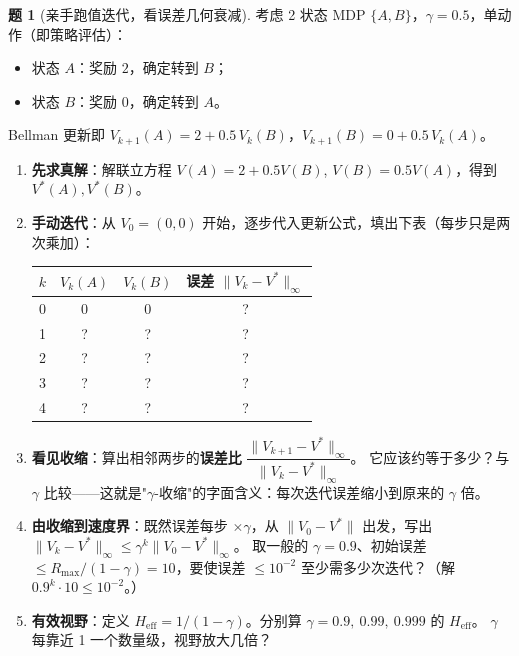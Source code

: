 \documentclass[11pt,a4paper]{article}
\theoremstyle{definition}
\newtheorem{problem}{题}
\begin{document}
\medskip

\begin{problem}[亲手跑值迭代，看误差几何衰减]
考虑 2 状态 MDP $\{A, B\}$，$\gamma = 0.5$，单动作（即策略评估）：
\begin{itemize}
    \item 状态 $A$：奖励 $2$，确定转到 $B$；
    \item 状态 $B$：奖励 $0$，确定转到 $A$。
\end{itemize}
Bellman 更新即 $V_{k+1}(A) = 2 + 0.5\,V_k(B)$，$V_{k+1}(B) = 0 + 0.5\,V_k(A)$。

\begin{enumerate}[label=(\alph*)]
    \item \textbf{先求真解}：解联立方程 $V(A) = 2 + 0.5 V(B)$, $V(B) = 0.5 V(A)$，得到 $V^*(A), V^*(B)$。
    \item \textbf{手动迭代}：从 $V_0 = (0, 0)$ 开始，逐步代入更新公式，填出下表（每步只是两次乘加）：
    \begin{center}
    \begin{tabular}{c|c|c|c}
    \toprule
    $k$ & $V_k(A)$ & $V_k(B)$ & 误差 $\|V_k - V^*\|_\infty$ \\
    \midrule
    0 & 0 & 0 & ? \\
    1 & ? & ? & ? \\
    2 & ? & ? & ? \\
    3 & ? & ? & ? \\
    4 & ? & ? & ? \\
    \bottomrule
    \end{tabular}
    \end{center}
    \item \textbf{看见收缩}：算出相邻两步的\textbf{误差比} $\dfrac{\|V_{k+1} - V^*\|_\infty}{\|V_k - V^*\|_\infty}$。
    它应该约等于多少？与 $\gamma$ 比较——这就是"$\gamma$-收缩"的字面含义：每次迭代误差缩小到原来的 $\gamma$ 倍。
    \item \textbf{由收缩到速度界}：既然误差每步 $\times\gamma$，从 $\|V_0 - V^*\|$ 出发，写出 $\|V_k - V^*\|_\infty \le \gamma^k \|V_0 - V^*\|_\infty$。
    取一般的 $\gamma = 0.9$、初始误差 $\le R_{\max}/(1-\gamma) = 10$，要使误差 $\le 10^{-2}$ 至少需多少次迭代？（解 $0.9^k \cdot 10 \le 10^{-2}$。）
    \item \textbf{有效视野}：定义 $H_{\mathrm{eff}} = 1/(1-\gamma)$。分别算 $\gamma = 0.9,\ 0.99,\ 0.999$ 的 $H_{\mathrm{eff}}$。
    $\gamma$ 每靠近 1 一个数量级，视野放大几倍？
\end{enumerate}
\begin{topicbox}

\end{topicbox}
\end{problem}
\end{document}

